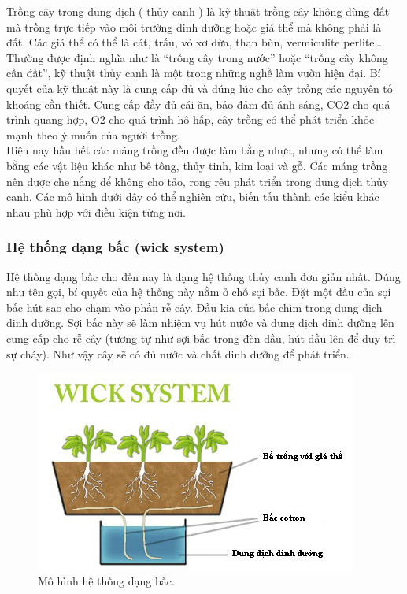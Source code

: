 \documentclass[a4paper,12pt,oneside]{article}
\begin{document}
\noindent Trồng cây trong dung dịch ( thủy canh ) là kỹ thuật trồng cây không dùng đất mà trồng trực tiếp vào môi trường dinh dưỡng hoặc giá thể mà không phải là đất. Các giá thể có thể là cát, trấu, vỏ xơ dừa, than bùn, vermiculite perlite… Thường được định nghĩa như là “trồng cây trong nước” hoặc “trồng cây không cần đất”, kỹ thuật thủy canh là một trong những nghề làm vườn hiện đại. Bí quyết của kỹ thuật này là cung cấp đủ và đúng lúc cho cây trồng các nguyên tố khoáng cần thiết. Cung cấp đầy đủ cái ăn, bảo đảm đủ ánh sáng, CO2 cho quá trình quang hợp, O2 cho quá trình hô hấp, cây trồng có thể phát triển khỏe mạnh theo ý muốn của người trồng.\\

\noindent Hiện nay hầu hết các máng trồng đều được làm bằng nhựa, nhưng có thể làm bằng các vật liệu khác như bê tông, thủy tinh, kim loại và gỗ. Các máng trồng nên được che nắng để không cho tảo, rong rêu phát triển trong dung dịch thủy canh. Các mô hình dưới đây có thể nghiên cứu, biến tấu thành các kiểu khác nhau phù hợp với điều kiện từng nơi.\\

\subsubsection{Hệ thống dạng bấc (wick system)}
\noindent Hệ thống dạng bấc cho đến nay là dạng hệ thống thủy canh đơn giản nhất. Đúng như tên gọi, bí quyết của hệ thống này nằm ở chỗ sợi bấc. Đặt một đầu của sợi bấc hút sao cho chạm vào phần rễ cây. Đầu kia của bấc chìm trong dung dịch dinh dưỡng. Sợi bấc này sẽ làm nhiệm vụ hút nước và dung dịch dinh dưỡng lên cung cấp cho rễ cây (tương tự như sợi bấc trong đèn dầu, hút dầu lên để duy trì sự cháy). Như vậy cây sẽ có đủ nước và chất dinh dưỡng để phát triển.\\
\begin{center}
\begin{figure}[htp]
\begin{center}
\includegraphics[scale=.8]{hinh/Wick_system.jpg}
\end{center}
\caption{Mô hình hệ thống dạng bấc.}

\end{figure}
\end{center}
\end{document}
